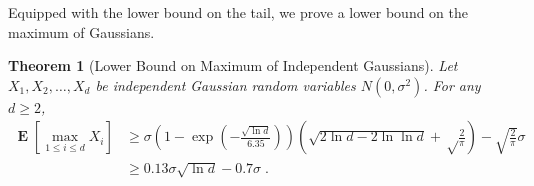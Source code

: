 \documentclass{article}
\DeclareMathOperator*{\Exp}{\mathbf{E}}
\newtheorem{theorem}{Theorem}
\begin{document}
Equipped with the lower bound on the tail, we prove a lower bound on the maximum of Gaussians.
%
\begin{theorem}[Lower Bound on Maximum of Independent Gaussians]
\label{theorem:maximum-of-gaussians}
Let $X_1, X_2, \dots, X_d$ be independent Gaussian random variables $N(0,\sigma^2)$. For any $d \ge 2$,
\begin{align}
\Exp \left[\max_{1 \le i \le d} X_i\right]
& \ge \sigma \left(1 - \exp\left(-\frac{\sqrt{\ln d}}{6.35}\right)\right) \left(\sqrt{2 \ln d - 2 \ln \ln d} +\sqrt\frac{2}{\pi}\right) -\sqrt{\frac{2}{\pi}} \sigma \label{equation:maximum-of-gaussians-lower-bound-1} \\
& \ge 0.13 \sigma \sqrt{\ln d} - 0.7 \sigma \label{equation:maximum-of-gaussians-lower-bound-2} \; .
\end{align}
\end{theorem}
%
\end{document}
